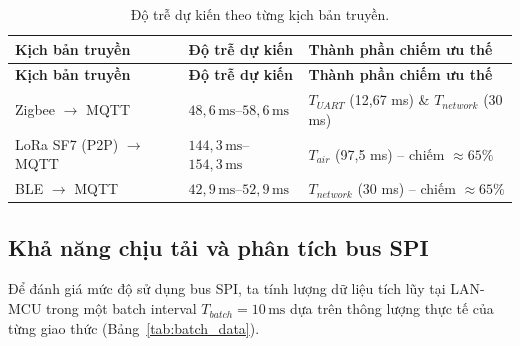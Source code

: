         \begin{longtable}{|p{4.5cm}|p{4.5cm}|p{5cm}|}
            \caption{Độ trễ dự kiến theo từng kịch bản truyền.} \label{tab:latency_estimation} \\
            \hline
            \textbf{Kịch bản truyền} & \textbf{Độ trễ dự kiến} & \textbf{Thành phần chiếm ưu thế} \\ \hline
            \endfirsthead
            \hline
            \textbf{Kịch bản truyền} & \textbf{Độ trễ dự kiến} & \textbf{Thành phần chiếm ưu thế} \\ \hline
            \endhead
            \hline
            \endfoot
            \endlastfoot
            Zigbee $\rightarrow$ MQTT & $48{,}6\,\text{ms}$--$58{,}6\,\text{ms}$ & $T_{UART}$ (12,67 ms) \& $T_{network}$ (30 ms) \\ \hline
            LoRa SF7 (P2P) $\rightarrow$ MQTT & $144{,}3\,\text{ms}$--$154{,}3\,\text{ms}$ & $T_{air}$ (97,5 ms) -- chiếm $\approx 65\%$ \\ \hline
            BLE $\rightarrow$ MQTT & $42{,}9\,\text{ms}$--$52{,}9\,\text{ms}$ & $T_{network}$ (30 ms) -- chiếm $\approx 65\%$ \\ \hline
        \end{longtable}
        
        \subsection{Khả năng chịu tải và phân tích bus SPI}
        \label{subsec:spi}
        
        Để đánh giá mức độ sử dụng bus SPI, ta tính lượng dữ liệu tích lũy tại LAN-MCU trong một batch interval $T_{batch} = 10\,\text{ms}$ dựa trên thông lượng thực tế của từng giao thức (Bảng~\ref{tab:batch_data}).
        
